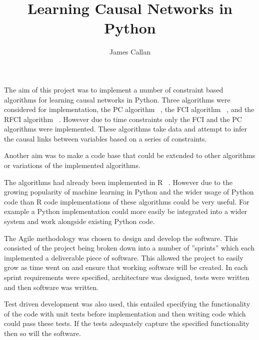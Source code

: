 \documentclass{UoYCSproject}
\begin{document}
\title{Learning Causal Networks in Python}
\author{James Callan}
\MEng
\date{}

\maketitle

\listoffigures
\listoftables

\begin{summary}
	The aim of this project was to implement a number of constraint based algorithms for learning causal networks in Python. Three algorithms were considered for implementation, the PC algorithm ~\parencite{spirtes1991algorithm}, the FCI algorithm ~\parencite{colombo2012learning}, and the RFCI algorithm ~\parencite{colombo2012learning}. However due to time constraints only the FCI and the PC algorithms were implemented. These algorithms take data and attempt to infer the causal links between variables based on a series of constraints.
	
	Another aim was to make a code base that could be extended to other algorithms or variations of the implemented algorithms.    
	
	The algorithms had already been implemented in R ~\parencite{kalisch_hauser_maechler}. However due to the growing popularity of machine learning in Python and the wider usage of Python code than R code implementations of these algorithms could be very useful. For example a Python implementation could more easily be integrated into a wider system and work alongside existing Python code.
	
	The Agile methodology was chosen to design and develop the software. This consisted of the project being broken down into a number of ''sprints'' which each implemented a deliverable piece of software. This allowed the project to easily grow as time went on and ensure that working software will be created.  In each sprint requirements were specified, architecture was designed, tests were written and then software was written.
	
	Test driven development was also used, this entailed specifying the functionality of the code with unit tests before implementation and then writing code which could pass these tests. If the tests adequately capture the specified functionality then so will the software.
	

\end{summary}
\end{document}
